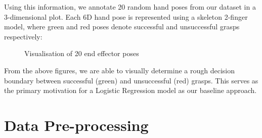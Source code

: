 \documentclass[11pt, a4paper]{report}
\theoremstyle{definition}
\begin{document}
\noindent Using this information, we annotate 20 random hand poses from our dataset in a 3-dimensional plot. Each 6D hand pose is represented using a skeleton 2-finger model, where green and red poses denote successful and unsuccessful grasps respectively:
\begin{figure}[H]%
    \centering
    \qquad
    \caption{Visualisation of 20 end effector poses}%
    \label{fig:hand_poses}%
\end{figure}
\noindent From the above figures, we are able to visually determine a rough decision boundary between successful (green) and unsuccessful (red) grasps. This serves as the primary motivation for a Logistic Regression model as our baseline approach.

\newpage
\section{Data Pre-processing}
\label{sec:4.3}
\end{document}
